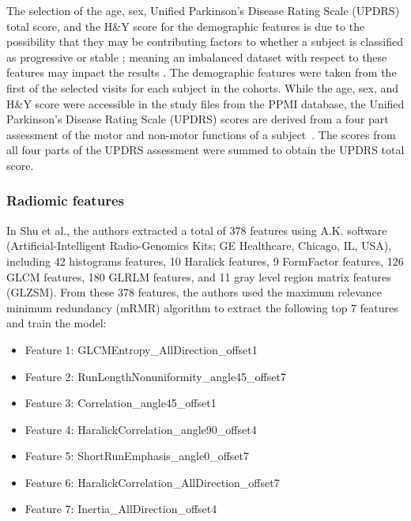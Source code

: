 The selection of the age, sex, Unified Parkinson's Disease Rating Scale (UPDRS) total score, and the H\&Y score 
for the demographic features is due to the possibility that they may be contributing factors to whether a subject 
is classified as progressive or stable ; meaning an imbalanced dataset with respect to these features may impact the results .  
The demographic features were taken from the first of the selected visits for each subject in the cohorts. While the age, sex, 
and H\&Y score were accessible in the study files from the PPMI database, the Unified Parkinson's Disease Rating Scale (UPDRS) scores 
are derived from a four part assessment of the motor and non-motor functions of a subject~\cite{goetz_tilley_shaftman_stebbins_fahn_martinez-martin_poewe_sampaio_stern_dodel_et_al._2008}. 
The scores from all four parts of the UPDRS assessment were summed to obtain the UPDRS total score.

\subsubsection*{Radiomic features}


In Shu et al., the authors extracted a total of 378 features using A.K. software (Artificial-Intelligent Radio-Genomics Kits; GE Healthcare, Chicago, IL, USA), including 42 histograms features, 10 Haralick features, 9 FormFactor features, 126 GLCM features, 180 GLRLM features, and 11 gray level region matrix features (GLZSM). From these 378 features, the authors used the maximum relevance minimum redundancy (mRMR) algorithm to extract the following top 7 features and train the model:
\begin{itemize}
    \item Feature 1: GLCMEntropy\_AllDirection\_offset1
    \item Feature 2: RunLengthNonuniformity\_angle45\_offset7
    \item Feature 3: Correlation\_angle45\_offset1
    \item Feature 4: HaralickCorrelation\_angle90\_offset4
    \item Feature 5: ShortRunEmphasis\_angle0\_offset7
    \item Feature 6: HaralickCorrelation\_AllDirection\_offset7
    \item Feature 7: Inertia\_AllDirection\_offset4
\end{itemize}

